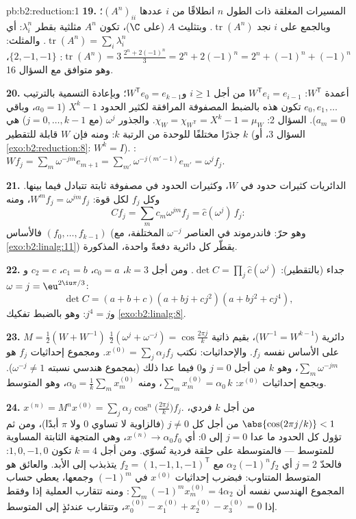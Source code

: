 \begin{solution}{pb:b2:reduction:1}
\textbf{19.} المسيرات المغلقة ذات الطول $n$ انطلاقًا من $i$ عددها
$(A^n)_{ii}$؛ وبالجمع على $i$ نجد $\operatorname{tr}(A^n)$.
وبتثليث $A$ (على $\C$)، تكون $A^n$ مثلثية بقطر
$\lambda_i^n$: أي $\operatorname{tr}(A^n) = \sum_i\lambda_i^n$.
والمثلث: $\operatorname{tr}(A^n) = 3\,\frac{2^n + 2(-1)^n}3 =
2^n + 2(-1)^n = 2^n + (-1)^n + (-1)^n$:  $\{2, -1,
-1\}$، وهو متوافق مع السؤال 16.

\textbf{20.} أعمدة $W^{\mathsf T}$: $W^{\mathsf T}e_i =
e_{i-1}$ من أجل $i \geq 1$ و$W^{\mathsf T}e_0 = e_{k-1}$؛
وبإعادة التسمية بالترتيب $e_0, e_1, \dots$ تكون هذه بالضبط
المصفوفة المرافقة لكثير الحدود $X^k - 1$ ($a_0 = 1$، وباقي $a_m = 0$).
السؤال 2: $\chi_{W} = \chi_{W^{\mathsf T}} = X^k - 1 =
\mu_{W}$. والجذور $\omega^j$ (مع $j = 0, \dots, k-1$) هي $k$
جذرًا مختلفًا للوحدة من الرتبة $k$: ومنه فإن $W$ قابلة للتقطير (السؤال
3، أو \cref{exo:b2:reduction:8}: $W^k = I$). : $Wf_j
= \sum_m \omega^{-jm}e_{m+1} = \sum_{m'}\omega^{-j(m'-1)}e_{m'}
= \omega^j f_j$.

\textbf{21.} الدائريات كثيرات حدود في $W$، وكثيرات الحدود
في مصفوفة ثابتة تتبادل فيما بينها. وكل $f_j$ 
لكل قوة: $W^m f_j = \omega^{jm}f_j$، ومنه
\[
Cf_j = \sum_m c_m\omega^{jm} f_j = \widehat c(\omega^j)\,f_j :
\]
فالأساس $(f_0, \dots, f_{k-1})$ (وهو حرّ: فاندرموند في العناصر
$\omega^{-j}$ المختلفة، مع \cref{exo:b2:linalg:11}) يقطّر
كل دائرية دفعةً واحدة،  المذكورة.

\textbf{22.}  جداء 
(بالتقطير): $\det C = \prod_{j}\widehat c(\omega^j)$. ومن أجل $k
= 3$، $c_0 = a$، $c_1 = b$، $c_2 = c$ و$\omega = j =
\eu^{2\iu\pi/3}$:
\[
\det C = (a + b + c)(a + bj + cj^2)(a + bj^2 + cj^4),
\]
و$j^4 = j$: وهو بالضبط تفكيك
\cref{exo:b2:linalg:8}.

\textbf{23.} $M = \frac12(W + W^{-1})$ دائرية ($W^{-1} =
W^{k-1}$)، بقيم ذاتية $\frac12(\omega^j + \omega^{-j}) =
\cos\frac{2\pi j}k$ على الأساس نفسه $f_j$. والإحداثيات: نكتب
$x^{(0)} = \sum_j \alpha_j f_j$. ومجموع إحداثيات $f_j$ هو
$\sum_m \omega^{-jm}$، وهو $k$ من أجل $j = 0$ و$0$
فيما عدا ذلك (بمجموع هندسي نسبته $\omega^{-j} \neq 1$).
وبجمع إحداثيات $x^{(0)}$: $\sum_m x^{(0)}_m =
\alpha_0\,k$، ومنه $\alpha_0 = \frac1k\sum_m x^{(0)}_m$، وهو المتوسط.

\textbf{24.} $x^{(n)} = M^nx^{(0)} = \sum_j
\alpha_j\cos^n\bigl(\tfrac{2\pi j}k\bigr)f_j$. من أجل $k$ فردي،
$\abs{\cos(2\pi j/k)} < 1$ من أجل كل $j \neq 0$ (فالزاوية لا تساوي
$0$ ولا $\pi$ أبدًا)، ومن ثم تؤول كل الحدود ما عدا $j = 0$ إلى $0$:
أي $x^{(n)} \to \alpha_0 f_0$، وهي المتجهة الثابتة المساوية
للمتوسط --- فالمتوسطة على حلقة فردية تُسوّي. ومن أجل $k = 4$ تكون
 $1, 0, -1, 0$: فالحدّ $j = 2$
أي $\alpha_2(-1)^nf_2$ مع $f_2 = (1, -1, 1, -1)^{\mathsf T}$
يتذبذب إلى الأبد. والعائق هو المتوسط المتناوب:
فبضرب إحداثيات $x^{(0)}$ في $(-1)^m$ وجمعها،
يعطي حساب المجموع الهندسي نفسه أن $\sum_m
(-1)^mx^{(0)}_m = 4\alpha_2$: ومنه تتقارب العملية إذا وفقط إذا
$x^{(0)}_0 - x^{(0)}_1 + x^{(0)}_2 - x^{(0)}_3 = 0$، وتتقارب عندئذٍ
إلى المتوسط.


\end{solution}

